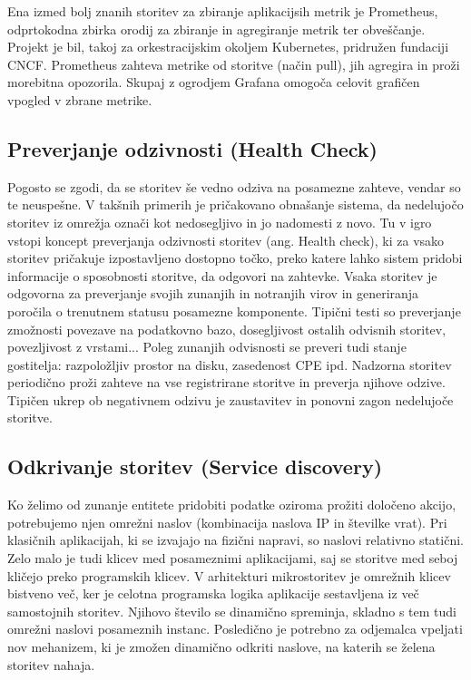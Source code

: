 \documentclass[a4paper, 12pt]{book}
\begin{document}
Ena izmed bolj znanih storitev za zbiranje aplikacijsih metrik je Prometheus, odprtokodna zbirka orodij za zbiranje in agregiranje metrik ter obveščanje.
Projekt je bil, takoj za orkestracijskim okoljem Kubernetes, pridružen fundaciji CNCF.
Prometheus zahteva metrike od storitve (način pull), jih agregira in proži morebitna opozorila.
Skupaj z ogrodjem Grafana omogoča celovit grafičen vpogled v zbrane metrike. \cite{Prometheus}


\subsection{Preverjanje odzivnosti (Health Check)}

Pogosto se zgodi, da se storitev še vedno odziva na posamezne zahteve, vendar so te neuspešne.
V takšnih primerih je pričakovano obnašanje sistema, da nedelujočo storitev iz omrežja označi kot nedosegljivo in jo nadomesti z novo.
Tu v igro vstopi koncept preverjanja odzivnosti storitev (ang. Health check), ki za vsako storitev pričakuje izpostavljeno dostopno točko, preko katere lahko sistem pridobi informacije o sposobnosti storitve, da odgovori na zahtevke.
Vsaka storitev je odgovorna za preverjanje svojih zunanjih in notranjih virov in generiranja poročila o trenutnem statusu posamezne komponente.
Tipični testi so preverjanje zmožnosti povezave na podatkovno bazo, dosegljivost ostalih odvisnih storitev, povezljivost z vrstami...
Poleg zunanjih odvisnosti se preveri tudi stanje gostitelja: razpoložljiv prostor na disku, zasedenost CPE ipd.
Nadzorna storitev periodično proži zahteve na vse registrirane storitve in preverja njihove odzive.
Tipičen ukrep ob negativnem odzivu je zaustavitev in ponovni zagon nedelujoče storitve. \cite{healthCheck}

\subsection{Odkrivanje storitev (Service discovery)}

Ko želimo od zunanje entitete pridobiti podatke oziroma prožiti določeno akcijo, potrebujemo njen omrežni naslov (kombinacija naslova IP in številke vrat).
Pri klasičnih aplikacijah, ki se izvajajo na fizični napravi, so naslovi relativno statični.
Zelo malo je tudi klicev med posameznimi aplikacijami, saj se storitve med seboj kličejo preko programskih klicev.
V arhitekturi mikrostoritev je omrežnih klicev bistveno več, ker je celotna programska logika aplikacije sestavljena iz več samostojnih storitev.
Njihovo število se dinamično spreminja, skladno s tem tudi omrežni naslovi posameznih instanc.
Posledično je potrebno za odjemalca vpeljati nov mehanizem, ki je zmožen dinamično odkriti naslove, na katerih se želena storitev nahaja.
\end{document}
